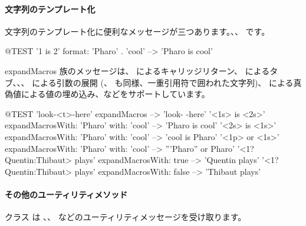 \documentclass[a4paper,10pt,twoside]{book}
\begin{document}

\paragraph{文字列のテンプレート化}
文字列のテンプレート化に便利なメッセージが三つあります。、、 です。

\begin{code}{@TEST}
'{1} is {2}' format: {'Pharo' . 'cool'}  --> 'Pharo is cool'
\end{code}

expandMacros 族のメッセージは、 によるキャリッジリターン、 によるタブ、、、 による引数の展開 (、 も同様、一重引用符で囲われた文字列)、 による真偽値による値の埋め込み、などをサポートしています。


\begin{code}{@TEST}
'look-<t>-here' expandMacros                                         --> 'look-	-here'
'<1s> is <2s>' expandMacrosWith: 'Pharo' with: 'cool'   --> 'Pharo is cool'
'<2s> is <1s>' expandMacrosWith: 'Pharo' with: 'cool'   --> 'cool is Pharo'
'<1p> or <1s>' expandMacrosWith: 'Pharo' with: 'cool'  --> '''Pharo'' or Pharo'
'<1?Quentin:Thibaut> plays' expandMacrosWith: true     --> 'Quentin plays'
'<1?Quentin:Thibaut> plays' expandMacrosWith: false    --> 'Thibaut plays'
\end{code}

\paragraph{その他のユーティリティメソッド}
クラス  は 、、 などのユーティリティメッセージを受け取ります。
\end{document}
